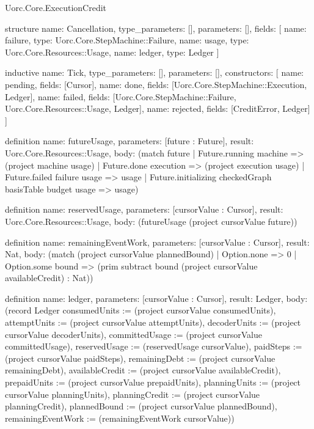 \begin{lexlean}{Uorc.Core.ExecutionCredit}
\begin{semanticmodule}
structure{
  name: Cancellation,
  type_parameters: [],
  parameters: [],
  fields: [
    {name: failure, type: Uorc.Core.StepMachine::Failure},
    {name: usage, type: Uorc.Core.Resources::Usage},
    {name: ledger, type: Ledger}
  ]
}

inductive{
  name: Tick,
  type_parameters: [],
  parameters: [],
  constructors: [
    {name: pending, fields: [Cursor]},
    {name: done, fields: [Uorc.Core.StepMachine::Execution, Ledger]},
    {name: failed, fields: [Uorc.Core.StepMachine::Failure, Uorc.Core.Resources::Usage, Ledger]},
    {name: rejected, fields: [CreditError, Ledger]}
  ]
}

definition{
  name: futureUsage,
  parameters: [future : Future],
  result: Uorc.Core.Resources::Usage,
  body: (match future
    | Future.running machine => (project machine usage)
    | Future.done execution => (project execution usage)
    | Future.failed failure usage => usage
    | Future.initializing checkedGraph basisTable budget usage => usage)
}

definition{
  name: reservedUsage,
  parameters: [cursorValue : Cursor],
  result: Uorc.Core.Resources::Usage,
  body: (futureUsage (project cursorValue future))
}

definition{
  name: remainingEventWork,
  parameters: [cursorValue : Cursor],
  result: Nat,
  body: (match (project cursorValue plannedBound)
    | Option.none => 0
    | Option.some bound => (prim subtract bound (project cursorValue availableCredit) : Nat))
}

definition{
  name: ledger,
  parameters: [cursorValue : Cursor],
  result: Ledger,
  body: (record Ledger {consumedUnits := (project cursorValue consumedUnits), attemptUnits := (project cursorValue attemptUnits), decoderUnits := (project cursorValue decoderUnits), committedUsage := (project cursorValue committedUsage), reservedUsage := (reservedUsage cursorValue), paidSteps := (project cursorValue paidSteps), remainingDebt := (project cursorValue remainingDebt), availableCredit := (project cursorValue availableCredit), prepaidUnits := (project cursorValue prepaidUnits), planningUnits := (project cursorValue planningUnits), planningCredit := (project cursorValue planningCredit), plannedBound := (project cursorValue plannedBound), remainingEventWork := (remainingEventWork cursorValue)})
}


\end{semanticmodule}
\end{lexlean}
